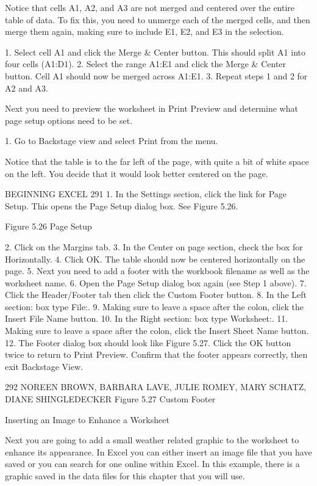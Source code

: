 Notice that cells A1, A2, and A3 are not merged and centered over the entire table of data. To fix this,
you need to unmerge each of the merged cells, and then merge them again, making sure to include E1,
E2, and E3 in the selection.

1. Select cell A1 and click the Merge & Center button. This should split A1 into four cells (A1:D1).
2. Select the range A1:E1 and click the Merge & Center button. Cell A1 should now be merged
across A1:E1.
3. Repeat steps 1 and 2 for A2 and A3.

Next you need to preview the worksheet in Print Preview and determine what page setup options
need to be set.

1. Go to Backstage view and select Print from the menu.

Notice that the table is to the far left of the page, with quite a bit of white space on the left. You decide
that it would look better centered on the page.



BEGINNING EXCEL 291
1. In the Settings section, click the link for Page Setup. This opens the Page Setup dialog box. See
Figure 5.26.




Figure 5.26 Page Setup


2.   Click on the Margins tab.
3.   In the Center on page section, check the box for Horizontally.
4.   Click OK. The table should now be centered horizontally on the page.
5.   Next you need to add a footer with the workbook filename as well as the worksheet name.
6.   Open the Page Setup dialog box again (see Step 1 above).
7.   Click the Header/Footer tab then click the Custom Footer button.
8.   In the Left section: box type File:.
9.   Making sure to leave a space after the colon, click the Insert File Name button.
10.   In the Right section: box type Worksheet:.
11.   Making sure to leave a space after the colon, click the Insert Sheet Name button.
12.   The Footer dialog box should look like Figure 5.27. Click the OK button twice to return to Print
Preview. Confirm that the footer appears correctly, then exit Backstage View.




292 NOREEN BROWN, BARBARA LAVE, JULIE ROMEY, MARY SCHATZ, DIANE SHINGLEDECKER
Figure 5.27 Custom Footer


Inserting an Image to Enhance a Worksheet

Next you are going to add a small weather related graphic to the worksheet to enhance its appearance.
In Excel you can either insert an image file that you have saved or you can search for one online within
Excel. In this example, there is a graphic saved in the data files for this chapter that you will use.


